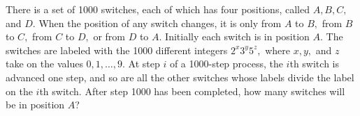 There is a set of 1000 switches, each of which has four positions, called $A, B, C,$ and $D.$  When the position of any switch changes, it is only from $A$ to $B,$ from $B$ to $C,$ from $C$ to $D,$ or from $D$ to $A.$  Initially each switch is in position $A.$  The switches are labeled with the 1000 different integers $2^x3^y5^z,$ where $x, y,$ and $z$ take on the values $0, 1, \ldots, 9.$  At step $i$ of a 1000-step process, the $i$th switch is advanced one step, and so are all the other switches whose labels divide the label on the $i$th switch.  After step 1000 has been completed, how many switches will be in position $A$?